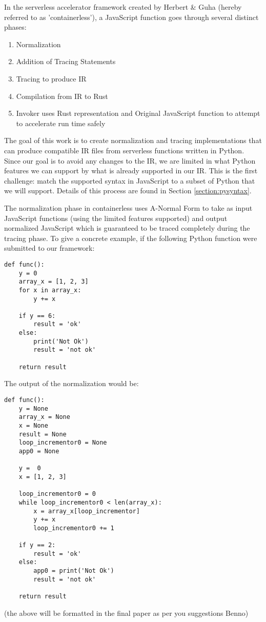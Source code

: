 \documentclass[acmsmall,review,authorversion]{acmart}
\begin{document}
In the serverless accelerator framework created by Herbert \& Guha (hereby referred to as 'containerless'), a JavaScript function goes through several distinct phases:
\begin{enumerate}
    \item Normalization
    \item Addition of Tracing Statements
    \item Tracing to produce IR
    \item Compilation from IR to Rust
    \item Invoker uses Rust representation and Original JavaScript function to attempt to accelerate run time safely
\end{enumerate}
The goal of this work is to create normalization and tracing implementations that can produce compatible IR files from serverless functions written in Python. Since our goal is to avoid any changes to the IR, we are limited in what Python features we can support by what is already supported in our IR. This is the first challenge: match the supported syntax in JavaScript to a subset of Python that we will support. Details of this process are found in Section \ref{section:pysyntax}.
\par
The normalization phase in containerless uses A-Normal Form to take as input JavaScript functions (using the limited features supported) and output normalized JavaScript which is guaranteed to be traced completely during the tracing phase. To give a concrete example, if the following Python function were submitted to our framework:
\begin{verbatim}
def func():
    y = 0
    array_x = [1, 2, 3]
    for x in array_x:
        y += x
        
    if y == 6:
        result = 'ok'
    else:
        print('Not Ok')
        result = 'not ok'
        
    return result
\end{verbatim}
The output of the normalization would be:
\begin{verbatim}
def func():
    y = None
    array_x = None
    x = None
    result = None
    loop_incrementor0 = None
    app0 = None
    
    y =  0
    x = [1, 2, 3]
    
    loop_incrementor0 = 0
    while loop_incrementor0 < len(array_x):
        x = array_x[loop_incrementor]
        y += x
        loop_incrementor0 += 1
        
    if y == 2:
        result = 'ok'
    else:
        app0 = print('Not Ok')
        result = 'not ok'
        
    return result
\end{verbatim}
(the above will be formatted in the final paper as per you suggestions Benno)
\end{document}

